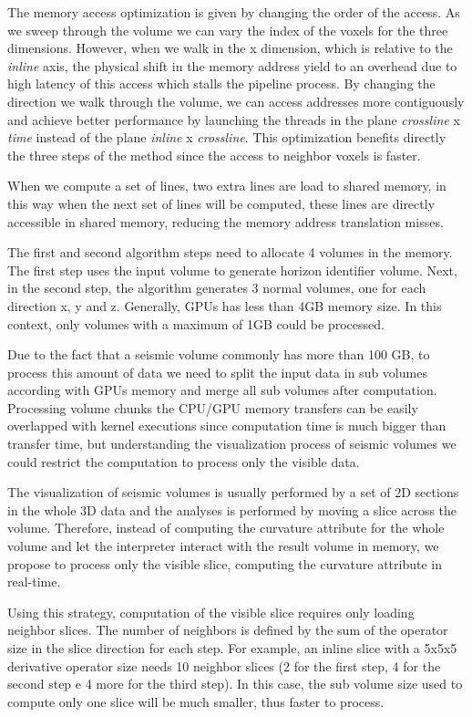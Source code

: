\documentclass[conference]{IEEEtran}
\begin{document}
The memory access optimization is given by changing the order of the access. As we sweep through the volume we can vary the index of the voxels for the three dimensions. However, when we walk in the x dimension, which is relative to the \emph{inline} axis, the physical shift in the memory address yield to an overhead due to high latency of this access which stalls the pipeline process. By changing the direction we walk through the volume, we can access addresses more contiguously and achieve better performance by launching the threads in the plane \emph{crossline} x \emph{time} instead of the plane \emph{inline} x \emph{crossline}. This optimization benefits directly the three steps of the method since the access to neighbor voxels is faster.

When we compute a set of lines, two extra lines are load to shared memory, in this way when the next set of lines will be computed, these lines are directly accessible in shared memory, reducing the memory address translation misses.

The first and second algorithm steps need to allocate 4 volumes in the memory. The first step uses the input volume to generate horizon identifier volume. Next, in the second step, the algorithm generates 3 normal volumes, one for each direction x, y and z. Generally, GPUs has less than 4GB memory size. In this context, only volumes with a maximum of 1GB could be processed.

Due to the fact that a seismic volume commonly has more than 100 GB, to process
this amount of data we need to split the input data in sub volumes according
with GPUs memory and merge all sub volumes after computation. Processing volume
chunks the CPU/GPU memory transfers can be easily overlapped with kernel executions since
computation time is much bigger than transfer time, but understanding the visualization
process of seismic volumes we could restrict the computation to process only the visible data.

The visualization of seismic volumes is usually performed by a set of 2D sections in the whole
3D data and the analyses is performed by moving a slice across the volume. Therefore, instead of computing the curvature attribute for the whole volume and let the interpreter
interact with the result volume in memory, we propose to process only the visible slice,
computing the curvature attribute in real-time.

Using this strategy, computation of the visible slice requires only loading neighbor slices.
The number of neighbors is defined by the sum of the operator size in the slice direction
for each step. For example, an inline slice with a 5x5x5 derivative operator size needs 10
neighbor slices (2 for the first step, 4 for the second step e 4 more for the third step).
In this case, the sub volume size used to compute only one slice will be much smaller,
thus faster to process.
\end{document}
